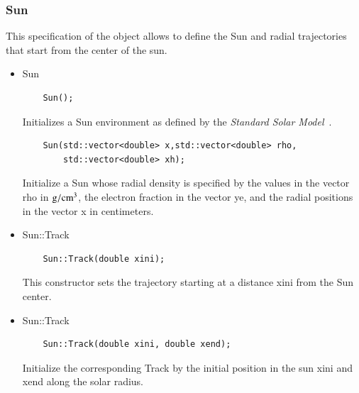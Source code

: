 \documentclass[3p,12pt]{elsarticle}
\newcommand{\ttf}{\ttfamily}
\begin{document}
\subsubsection{{Sun}\label{sec:sun}}
This specification of the object allows to define the Sun and radial
trajectories that start from the center of the sun.
\begin{itemize}
\item {\ttf Sun}
  \begin{lstlisting}
    Sun();
  \end{lstlisting}
  Initializes a {\ttf Sun} environment as defined by the {\it
    Standard Solar Model}~\citep{bahcall2005new}.
  
  \begin{lstlisting}
    Sun(std::vector<double> x,std::vector<double> rho,
        std::vector<double> xh);
  \end{lstlisting}
  Initialize a {\ttf Sun} whose radial density is specified by the
  values in the vector {\ttf rho} in ${\rm g}/{\rm cm}^3$, the
  electron fraction in the vector {\ttf ye}, and the radial positions
  in the vector {\ttf x} in centimeters. 
  
\item {\ttf Sun::Track}
  \begin{lstlisting}
    Sun::Track(double xini);
  \end{lstlisting}
  This constructor sets the trajectory starting at a distance 
  {\ttf xini} from the Sun center.
  \item {\ttf Sun::Track}
  \begin{lstlisting}
    Sun::Track(double xini, double xend);
  \end{lstlisting}
  Initialize the corresponding {\ttf Track} by the initial position in the sun {\ttf xini} and {\ttf xend} along the solar radius.
\end{itemize}
\end{document}
